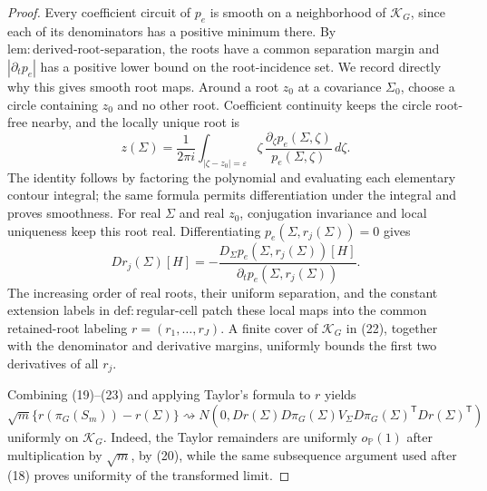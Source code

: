 \documentclass{article}
\begin{document}
\begin{proof}
Every coefficient circuit of \(p_e\) is smooth on a neighborhood of \(\mathcal K_G\), since each of its denominators has a positive minimum there.  By \(\mathrm{lem:derived\mbox{-}root\mbox{-}separation}\), the roots have a common separation margin and \(|\partial_t p_e|\) has a positive lower bound on the root-incidence set.  We record directly why this gives smooth root maps.  Around a root \(z_0\) at a covariance \(\Sigma_0\), choose a circle containing \(z_0\) and no other root.  Coefficient continuity keeps the circle root-free nearby, and the locally unique root is
\[
 z(\Sigma)=\frac{1}{2\pi i}\int_{|\zeta-z_0|=\varepsilon}
 \zeta\,\frac{\partial_\zeta p_e(\Sigma,\zeta)}{p_e(\Sigma,\zeta)}\,d\zeta.
\tag{22}
\]
The identity follows by factoring the polynomial and evaluating each elementary contour integral; the same formula permits differentiation under the integral and proves smoothness.  For real \(\Sigma\) and real \(z_0\), conjugation invariance and local uniqueness keep this root real.  Differentiating \(p_e(\Sigma,r_j(\Sigma))=0\) gives
\[
 Dr_j(\Sigma)[H]
 =-\frac{D_\Sigma p_e(\Sigma,r_j(\Sigma))[H]}
          {\partial_t p_e(\Sigma,r_j(\Sigma))}.
\tag{23}
\]
The increasing order of real roots, their uniform separation, and the constant extension labels in \(\mathrm{def:regular\mbox{-}cell}\) patch these local maps into the common retained-root labeling \(r=(r_1,\ldots,r_J)\).  A finite cover of \(\mathcal K_G\) in (22), together with the denominator and derivative margins, uniformly bounds the first two derivatives of all \(r_j\).

Combining (19)--(23) and applying Taylor's formula to \(r\) yields
\[
 \sqrt m\{r(\pi_G(S_m))-r(\Sigma)\}
 \rightsquigarrow N\!\left(0,
 Dr(\Sigma)D\pi_G(\Sigma)V_\Sigma
 D\pi_G(\Sigma)^{\mathsf T}Dr(\Sigma)^{\mathsf T}
 \right)
\tag{24}
\]
uniformly on \(\mathcal K_G\).  Indeed, the Taylor remainders are uniformly \(o_{\mathbb P}(1)\) after multiplication by \(\sqrt m\), by (20), while the same subsequence argument used after (18) proves uniformity of the transformed limit.


\end{proof}
\end{document}

